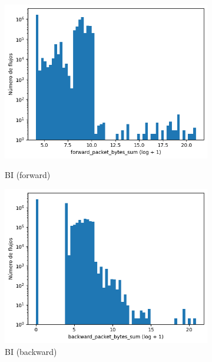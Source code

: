 \begin{figure}[H]
\begin{subfigure}[b]{0.26\textwidth}
        \includegraphics[width=\textwidth]{media/packet_pincer_botiot/forward_packet_bytes_sum_log_x_log_y.png}
        \caption{BI (forward)}
        \includegraphics[width=\textwidth]{media/packet_pincer_botiot/backward_packet_bytes_sum_log_x_log_y.png}
        \caption{BI (backward)}
    \end{subfigure}
    \hfill
    \begin{subfigure}[b]{0.26\textwidth}
        \centering

\end{subfigure}
\end{figure}
